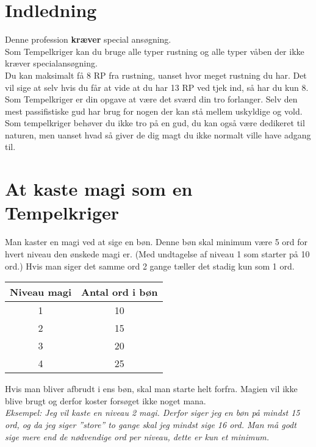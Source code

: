 \chapter{Indledning}

Denne profession \textbf{kræver} special ansøgning. \\
Som Tempelkriger kan du bruge alle typer rustning og alle typer våben der ikke kræver specialansøgning.\\
Du kan maksimalt få 8 RP fra rustning, uanset hvor meget rustning du har. Det vil sige at selv hvis du får at vide at du har 13 RP ved tjek ind, så har du kun 8.\\

Som Tempelkriger er din opgave at være det sværd din tro forlanger. Selv den mest passifistiske gud har brug for nogen der kan stå mellem uskyldige og vold. Som tempelkriger behøver du ikke tro på en gud, du kan også være dedikeret til naturen, men uanset hvad så giver de dig magt du ikke normalt ville have adgang til.

\chapter{At kaste magi som en Tempelkriger}


Man kaster en magi ved at sige en bøn. Denne bøn skal minimum være 5 ord for hvert niveau den ønskede magi er. (Med undtagelse af niveau 1 som starter på 10 ord.) Hvis man siger det samme ord 2 gange tæller det stadig kun som 1 ord.\\
\begin{table}[H]
    \centering
    \begin{tabular}{c|c}
        Niveau magi & Antal ord i bøn \\\hline
        1 & 10\\
        2 & 15\\
        3 & 20\\
        4 & 25\\
    \end{tabular}
\end{table}

Hvis man bliver afbrudt i ens bøn, skal man starte helt forfra. Magien vil ikke blive brugt og derfor koster forsøget ikke noget mana.\\
\textit{Eksempel: Jeg vil kaste en niveau 2 magi. Derfor siger jeg en bøn på mindst 15 ord, og da jeg siger ”store” to gange skal jeg mindst sige 16 ord. Man må godt sige mere end de nødvendige ord per niveau, dette er kun et minimum.}

